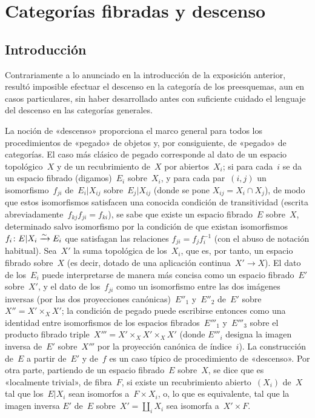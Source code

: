 \chapter{Categorías fibradas y descenso}
\label{VI}
%

\setcounter{section}{-1}
\section{Introducción}

Contrariamente a lo anunciado en la introducción de la exposición
anterior, resultó imposible efectuar el descenso en la categoría de los
preesquemas, aun en casos particulares, sin haber desarrollado antes con
suficiente cuidado el lenguaje del descenso en las categorías generales.

La noción de «descenso» proporciona el marco general para todos los
procedimientos de «pegado» de objetos y, por consiguiente, de «pegado» de
categorías. El caso más clásico de pegado corresponde al dato de un espacio
topológico~$X$ y de un recubrimiento de~$X$ por abiertos~$X_i$; si para cada~$i$
se da un espacio fibrado (digamos)~$E_i$ sobre~$X_i$, y para cada par~$(i,j)$
un isomorfismo~$f_{ji}$ de~$E_i|X_{ij}$ sobre~$E_j|X_{ij}$ (donde se pone
$X_{ij}=X_i\cap X_j$), de modo que estos isomorfismos satisfacen una conocida
condición de transitividad
(escrita abreviadamente~$f_{kj}f_{ji}=f_{ki}$), se sabe que existe un espacio
fibrado~$E$ sobre~$X$, determinado salvo isomorfismo por la condición de que
existan isomorfismos~$f_i\colon E|X_i\xrightarrow{\sim} E_i$ que satisfagan las relaciones
$f_{ji}=f_jf_i^{-1}$ (con el abuso de notación habitual). Sea~$X'$ la suma
topológica de los~$X_i$, que es, por tanto, un espacio fibrado sobre~$X$ (es decir,
dotado de una aplicación continua~$X'\to X$). El dato de los~$E_i$ puede
interpretarse de manera más concisa como un espacio fibrado~$E'$ sobre~$X'$,
y el dato de los~$f_{ji}$ como un isomorfismo entre las dos imágenes inversas
(por las dos proyecciones canónicas)~$E''_1$ y~$E''_2$ de~$E'$ sobre
$X''=X'\times_X X'$; la condición de pegado puede escribirse entonces como
una identidad entre isomorfismos de los espacios fibrados~$E'''_1$ y~$E'''_3$
sobre el producto fibrado triple~$X'''=X'\times_X X'\times_X X'$ (donde
$E'''_i$ designa la imagen inversa de~$E'$ sobre~$X'''$ por la proyección
canónica de índice~$i$). La construcción de~$E$ a partir de~$E'$ y de~$f$ es
un caso típico
%
de procedimiento de «descenso». Por otra parte, partiendo de un espacio
fibrado~$E$ sobre~$X$, se dice que
 es «localmente trivial», de fibra~$F$,
si existe un recubrimiento abierto~$(X_i)$ de~$X$ tal que los~$E|X_i$ sean
isomorfos a~$F\times X_i$, o, lo que es equivalente, tal que la imagen inversa
$E'$ de~$E$ sobre~$X'=\coprod_i X_i$ sea isomorfa a~$X'\times F$.

